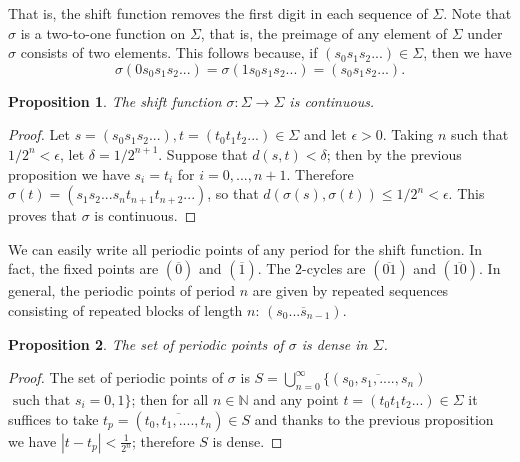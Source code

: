 \documentclass[12pt,a4paper]{report}
\newtheorem{proposicion}{Proposition}[section]
\theoremstyle{definition}
\begin{document}
That is, the shift function removes the first digit in each sequence of \(\Sigma\). Note that \(\sigma\) is a two-to-one function on \(\Sigma\), that is, the preimage of any element of \(\Sigma\) under \(\sigma\) consists of two elements. This follows because, if \((s_{0}s_{1}s_{2}...)\in\Sigma\), then we have
\[
\sigma(0s_{0}s_{1}s_{2}...)=\sigma(1s_{0}s_{1}s_{2}...)=(s_{0}s_{1}s_{2}...).
\]
%



\begin{proposicion}

The shift function 
\(\sigma:\Sigma\rightarrow\Sigma\) is continuous.

\end{proposicion}

\begin{proof}

Let \(s=(s_{0}s_{1}s_{2}...), t=(t_{0}t_{1}t_{2}...)\in\Sigma\) and let \(\epsilon>0\). Taking \(n\) such that \(1/2^{n}<\epsilon\), let \(\delta=1/2^{n+1}\). Suppose that \(d(s,t)<\delta\); then by the previous proposition we have \(s_{i}=t_{i}\) for \(i=0,...,n+1\). Therefore \(\sigma(t)=(s_{1}s_{2}...s_{n}t_{n+1}t_{n+2}...)\), so that \(d(\sigma(s),\sigma(t))\le1/2^{n}<\epsilon\). This proves that \(\sigma\) is continuous.

\end{proof} 

We can easily write all periodic points of any period for the shift function. In fact, the fixed points are \((\overline{0})\) and \((\overline{1})\). The $2$-cycles are \((\overline{01})\) and  \((\overline{10})\). In general, the periodic points of period \(n\) are given by repeated sequences consisting of repeated blocks of length \(n\): \((\overline{s_{0}...s_{n-1}})\).

\begin{proposicion}

The set of periodic points of $\sigma$ is dense in $\Sigma$.

\end{proposicion}

\begin{proof}

The set of periodic points of $\sigma$ is $S = \bigcup_{n=0}^\infty \{ (\overline{s_0,s_1,....,s_n}) $ $\text{ such that } s_i = 0,1\}$; then for all $n \in \mathbb{N}$ and
any point \(t=(t_{0}t_{1}t_{2}...) \in \Sigma\) it suffices to take $t_p = (\overline{t_0,t_1,....,t_n}) \in S$ and thanks to the previous proposition we have $|t - t_p|< \frac{1}{2^n}$; therefore $S$ is dense.
    
\end{proof}
\end{document}

